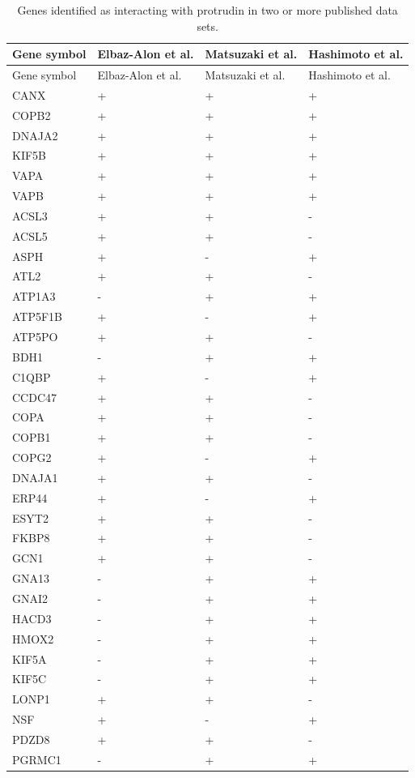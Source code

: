 \documentclass[
  12pt,
  a4paper,
]{book}
\begin{document}
\begin{longtable}[]{@{}llll@{}}
\caption{\label{tab:overlap-table}Genes identified as interacting with protrudin in two or more published data sets.}\tabularnewline
\toprule\noalign{}
Gene symbol & Elbaz-Alon et al. & Matsuzaki et al. & Hashimoto et al. \\
\midrule\noalign{}
\endfirsthead
\toprule\noalign{}
Gene symbol & Elbaz-Alon et al. & Matsuzaki et al. & Hashimoto et al. \\
\midrule\noalign{}
\endhead
\bottomrule\noalign{}
\endlastfoot
CANX & + & + & + \\
COPB2 & + & + & + \\
DNAJA2 & + & + & + \\
KIF5B & + & + & + \\
VAPA & + & + & + \\
VAPB & + & + & + \\
ACSL3 & + & + & - \\
ACSL5 & + & + & - \\
ASPH & + & - & + \\
ATL2 & + & + & - \\
ATP1A3 & - & + & + \\
ATP5F1B & + & - & + \\
ATP5PO & + & + & - \\
BDH1 & - & + & + \\
C1QBP & + & - & + \\
CCDC47 & + & + & - \\
COPA & + & + & - \\
COPB1 & + & + & - \\
COPG2 & + & - & + \\
DNAJA1 & + & + & - \\
ERP44 & + & - & + \\
ESYT2 & + & + & - \\
FKBP8 & + & + & - \\
GCN1 & + & + & - \\
GNA13 & - & + & + \\
GNAI2 & - & + & + \\
HACD3 & - & + & + \\
HMOX2 & - & + & + \\
KIF5A & - & + & + \\
KIF5C & - & + & + \\
LONP1 & + & + & - \\
NSF & + & - & + \\
PDZD8 & + & + & - \\
PGRMC1 & - & + & + \\

\end{longtable}
\end{document}
